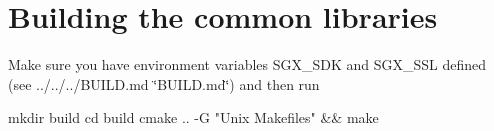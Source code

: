\section*{Building the common libraries}

Make sure you have environment variables {\ttfamily S\+G\+X\+\_\+\+S\+DK} and {\ttfamily S\+G\+X\+\_\+\+S\+SL} defined (see ../../../\+B\+U\+I\+LD.md \char`\"{}\+B\+U\+I\+L\+D.\+md\char`\"{}) and then run 
\begin{DoxyCode}
mkdir build
cd build
cmake .. -G "Unix Makefiles" && make
\end{DoxyCode}
 